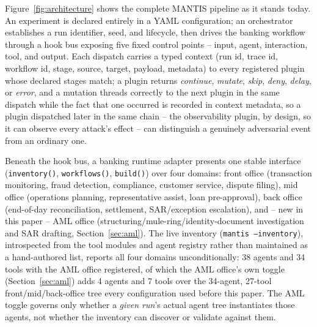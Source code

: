 \documentclass[conference]{IEEEtran}
\begin{document}
Figure~\ref{fig:architecture} shows the complete MANTIS pipeline as it stands today. An experiment is declared entirely in a YAML configuration; an orchestrator establishes a run identifier, seed, and lifecycle, then drives the banking workflow through a hook bus exposing five fixed control points -- input, agent, interaction, tool, and output. Each dispatch carries a typed context (run id, trace id, workflow id, stage, source, target, payload, metadata) to every registered plugin whose declared stages match; a plugin returns \emph{continue}, \emph{mutate}, \emph{skip}, \emph{deny}, \emph{delay}, or \emph{error}, and a mutation threads correctly to the next plugin in the same dispatch while the fact that one occurred is recorded in context metadata, so a plugin dispatched later in the same chain -- the observability plugin, by design, so it can observe every attack's effect -- can distinguish a genuinely adversarial event from an ordinary one.

Beneath the hook bus, a banking runtime adapter presents one stable interface (\texttt{inventory()}, \texttt{workflows()}, \texttt{build()}) over four domains: front office (transaction monitoring, fraud detection, compliance, customer service, dispute filing), mid office (operations planning, representative assist, loan pre-approval), back office (end-of-day reconciliation, settlement, SAR/exception escalation), and -- new in this paper -- AML office (structuring/mule-ring/identity-document investigation and SAR drafting, Section~\ref{sec:aml}). The live inventory (\texttt{mantis --inventory}), introspected from the tool modules and agent registry rather than maintained as a hand-authored list, reports all four domains unconditionally: 38 agents and 34 tools with the AML office registered, of which the AML office's own toggle (Section~\ref{sec:aml}) adds 4 agents and 7 tools over the 34-agent, 27-tool front/mid/back-office tree every configuration used before this paper. The AML toggle governs only whether a \emph{given run}'s actual agent tree instantiates those agents, not whether the inventory can discover or validate against them.
\end{document}
